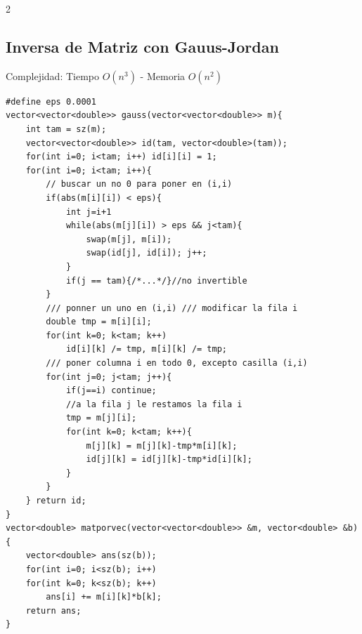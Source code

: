 \documentclass[10pt,spanish,mexico]{article}
\numberwithin{equation}{section}
\begin{document}
\begin{multicols}{2}
\subsection{Inversa de Matriz con Gauus-Jordan}
Complejidad: Tiempo $O\left(n^3\right)$ - Memoria $O\left(n^2\right)$
\begin{verbatim}
#define eps 0.0001
vector<vector<double>> gauss(vector<vector<double>> m){
    int tam = sz(m);
    vector<vector<double>> id(tam, vector<double>(tam));
    for(int i=0; i<tam; i++) id[i][i] = 1;
    for(int i=0; i<tam; i++){
        // buscar un no 0 para poner en (i,i)
        if(abs(m[i][i]) < eps){
            int j=i+1
            while(abs(m[j][i]) > eps && j<tam){
                swap(m[j], m[i]);
                swap(id[j], id[i]); j++;
            }
            if(j == tam){/*...*/}//no invertible
        }
        /// ponner un uno en (i,i) /// modificar la fila i
        double tmp = m[i][i];
        for(int k=0; k<tam; k++)
            id[i][k] /= tmp, m[i][k] /= tmp;
        /// poner columna i en todo 0, excepto casilla (i,i)
        for(int j=0; j<tam; j++){
            if(j==i) continue;
            //a la fila j le restamos la fila i
            tmp = m[j][i];
            for(int k=0; k<tam; k++){
                m[j][k] = m[j][k]-tmp*m[i][k];
                id[j][k] = id[j][k]-tmp*id[i][k];
            }
        }
    } return id;
}
vector<double> matporvec(vector<vector<double>> &m, vector<double> &b){
    vector<double> ans(sz(b));
    for(int i=0; i<sz(b); i++)
    for(int k=0; k<sz(b); k++)
        ans[i] += m[i][k]*b[k];
    return ans;
}
\end{verbatim}

\vspace{-1.2\baselineskip}
\hrulefill

\end{multicols}
\end{document}
